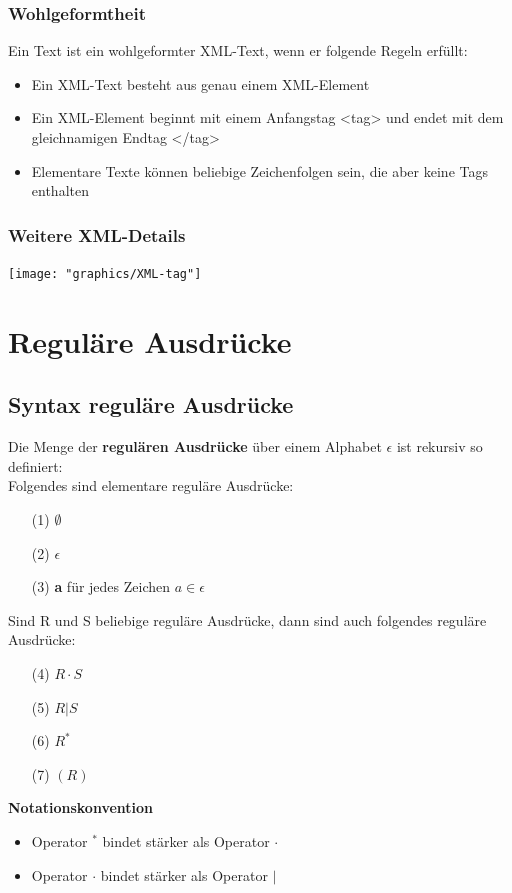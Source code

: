 \documentclass{scrreprt}
\begin{document}
\subsection{Wohlgeformtheit}
Ein Text ist ein wohlgeformter XML-Text, wenn er folgende Regeln erfüllt:
\begin{itemize}
    \item Ein XML-Text besteht aus genau einem XML-Element
    \item Ein XML-Element beginnt mit einem Anfangstag <tag> und endet mit dem gleichnamigen Endtag </tag>
    \item Elementare Texte können beliebige Zeichenfolgen sein, die aber keine Tags enthalten
\end{itemize}
\subsection{Weitere XML-Details}
\texttt{[image: "graphics/XML-tag"]}
\pagebreak
\chapter{Reguläre Ausdrücke}
\section{Syntax reguläre Ausdrücke}
Die Menge der \textbf{regulären Ausdrücke} über einem Alphabet $\epsilon$ ist rekursiv so definiert:
\\Folgendes sind elementare reguläre Ausdrücke:
\begin{itemize}
    \item [(1)] $\emptyset$
    \item [(2)] $\epsilon$
    \item [(3)] \textbf{a} für jedes Zeichen $a \in \epsilon$
\end{itemize}
Sind R und S beliebige reguläre Ausdrücke, dann sind auch folgendes reguläre Ausdrücke:
\begin{itemize}
    \item [(4)] $R \cdot S$
    \item [(5)] $R | S$
    \item [(6)] $R^{*}$
    \item [(7)] $(R)$
\end{itemize}
\textbf{Notationskonvention}
\begin{itemize}
    \item Operator $^{*}$ bindet stärker als Operator $\cdot$
    \item Operator $\cdot$ bindet stärker als Operator $|$
\end{itemize}
\end{document}
